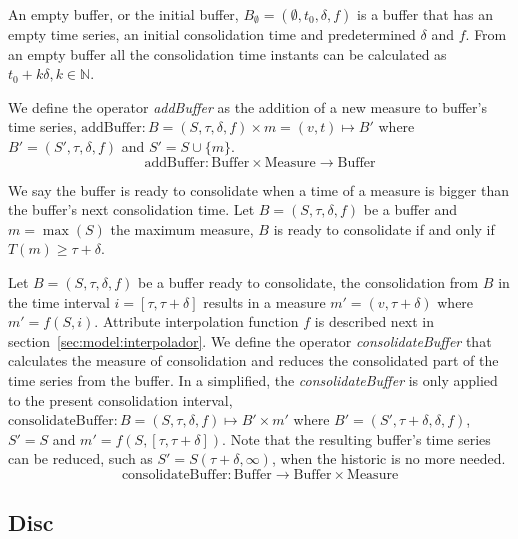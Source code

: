 An empty buffer, or the initial buffer, $B_{\emptyset} =
(\emptyset,t_0, \delta, f)$ is a buffer that has an empty time series,
an initial consolidation time and predetermined $\delta$ and $f$. From
an empty buffer all the consolidation time instants can be calculated
as $t_0+k\delta, k\in\mathbb{N}$.

We define the operator \emph{addBuffer} as the addition of a new
measure to buffer's time series, $\text{addBuffer}: B =
(S,\tau,\delta,f) \times m = (v,t) \mapsto B'$ where
$B'=(S',\tau,\delta,f)$ and $S' = S \cup \{m\} $.
\[
\text{addBuffer}: \text{Buffer} \times \text{Measure} \longrightarrow
\text{Buffer}
\]



We say the buffer is ready to consolidate when a time of a measure is
bigger than the buffer's next consolidation time.  Let
$B=(S,\tau,\delta,f)$ be a buffer and $m=\max(S)$ the maximum measure,
$B$ is ready to consolidate if and only if $T(m) \geq \tau+\delta$.



Let $B=(S,\tau,\delta,f)$ be a buffer ready to consolidate, the
consolidation from $B$ in the time interval $i=[\tau,\tau+\delta]$
results in a measure $m'=(v,\tau+\delta)$ where $m'=f(S,i)$. Attribute
interpolation function $f$ is described next in
section~\ref{sec:model:interpolador}.  We define the operator
\emph{consolidateBuffer} that calculates the measure of consolidation
and reduces the consolidated part of the time series from the
buffer. In a simplified, the \emph{consolidateBuffer} is only applied
to the present consolidation interval, $\text{consolidateBuffer}:
B=(S,\tau,\delta,f) \mapsto B' \times m' $ where $ B'=
(S',\tau+\delta,\delta,f)$, $ S' = S$ and $m' =
f(S,[\tau,\tau+\delta])$. Note that the resulting buffer's time series
can be reduced, such as $ S' = S(\tau+\delta,\infty)$, when the
historic is no more needed.
  \[
  \text{consolidateBuffer}: \text{Buffer} \longrightarrow \text{Buffer}
  \times \text{Measure}
  \]








\subsection{Disc}\label{sec:model:disc}


